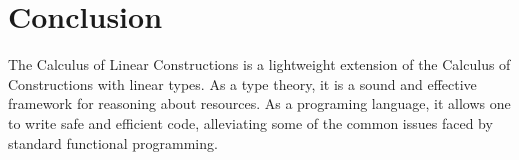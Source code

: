 \documentclass[sigplan,screen,review,authordraft]{acmart}
\theoremstyle{definition}
\begin{document}
  \section{Conclusion}
  The Calculus of Linear Constructions is a lightweight extension of the Calculus of Constructions with linear types. As a type theory, it is a sound and effective framework for reasoning about resources. As a programing language, it allows one to write safe and efficient code, alleviating some of the common issues faced by standard functional programming.



\end{document}
